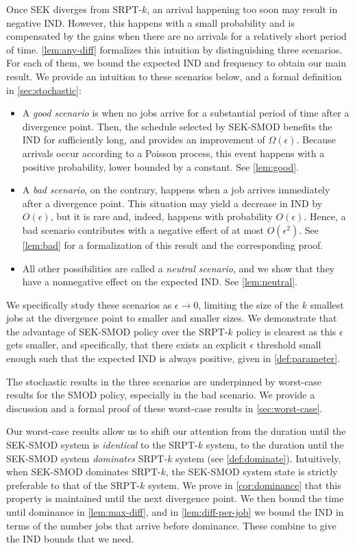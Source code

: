 \documentclass[acmsmall]{acmart}
\begin{document}
Once SEK diverges from SRPT-$k$, an arrival happening too soon may result in negative IND. However, this happens with a small probability and is compensated by the gains when there are no arrivals for a relatively short period of time. \cref{lem:any-diff} formalizes this intuition by distinguishing three scenarios. For each of them, we bound the expected IND and frequency to obtain our main result. We provide an intuition to these scenarios below, and a formal definition in \cref{sec:stochastic}:
\begin{itemize}
    \item A \textit{good scenario} is when no jobs arrive for a substantial period of time after a divergence point. Then, the schedule selected by SEK-SMOD benefits the IND for sufficiently long, and provides an improvement of $\Omega(\epsilon)$. Because arrivals occur according to a Poisson process, this event happens with a positive probability, lower bounded by a constant. See \cref{lem:good}.
    \item A \textit{bad scenario}, on the contrary, happens when a job arrives immediately after a divergence point. This situation may yield a decrease in IND by $O(\epsilon)$, but it is rare and, indeed, happens with probability $O(\epsilon)$. Hence, a bad scenario contributes with a negative effect of at most $O(\epsilon^2)$. See \cref{lem:bad} for a formalization of this result and the corresponding proof.
    \item All other possibilities are called a \textit{neutral scenario}, and we show that they have a nonnegative effect on the expected IND. See \cref{lem:neutral}.
\end{itemize}


We specifically study these scenarios as $\epsilon \to 0$, limiting the size of the $k$ smallest jobs at the divergence point to smaller and smaller sizes.
We demonstrate that the advantage of SEK-SMOD policy over the SRPT-$k$ policy is clearest as this $\epsilon$ gets smaller, and specifically, that there exists an explicit $\epsilon$ threshold small enough such that the expected IND is always positive, given in \cref{def:parameter}.

The stochastic results in the three scenarios are underpinned by worst-case results for the SMOD policy, especially in the bad scenario.
We provide a discussion and a formal proof of these worst-case results in \cref{sec:worst-case}.

Our worst-case results allow us to shift our attention from the duration until the SEK-SMOD system is \emph{identical} to the SRPT-$k$ system, to the duration until the SEK-SMOD system \emph{dominates} SRPT-$k$ system (see \cref{def:dominate}). Intuitively, when SEK-SMOD dominates SRPT-$k$, the SEK-SMOD system state is strictly preferable to that of the SRPT-$k$ system. We prove in \cref{cor:dominance} that this property is maintained until the next divergence point. We then bound the time until dominance in \cref{lem:max-diff}, and in \cref{lem:diff-per-job} we bound the IND in terms of the number jobs that arrive before dominance.
These combine to give the IND bounds that we need.
\end{document}
